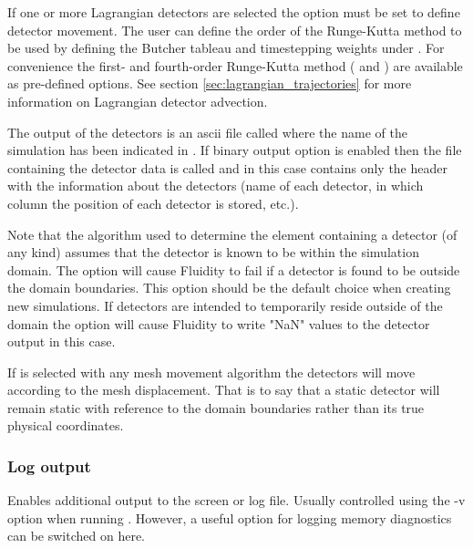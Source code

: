 If one or more Lagrangian detectors are selected the option  must be set to define detector movement. 
The user can define the order of the Runge-Kutta method to be used by defining the Butcher tableau and timestepping weights under . 
For convenience the first- and fourth-order Runge-Kutta method ( and ) are available as pre-defined options. 
See section \ref{sec:lagrangian_trajectories} for more information on Lagrangian detector advection.

The output of the detectors is an ascii file called
 where the name of the simulation has
been indicated in . If binary output
  option is enabled then the file containing the detector data is called
 and in this case  contains only the header with the
information about the detectors (name of each detector, in which column the
position of each detector is stored, etc.).

Note that the algorithm used to determine the element containing a detector (of
any kind) assumes that the detector is known to be within the simulation domain.
The option  will cause Fluidity to fail if a detector
is found to be outside the domain boundaries. 
This option should be the default choice when creating new simulations.
If detectors are intended to temporarily reside outside of the domain the option
 will cause Fluidity to write "NaN" values 
to the detector output in this case.

If  is selected with any mesh movement algorithm the 
detectors will move according to the mesh displacement. 
That is to say that a static detector will remain static with reference to the 
domain boundaries rather than its true physical coordinates.

\subsubsection{Log output}

Enables additional output to the screen or log file. Usually controlled
using the -v option when running \fluidity. However, a useful option for
logging memory diagnostics can be switched on here.

